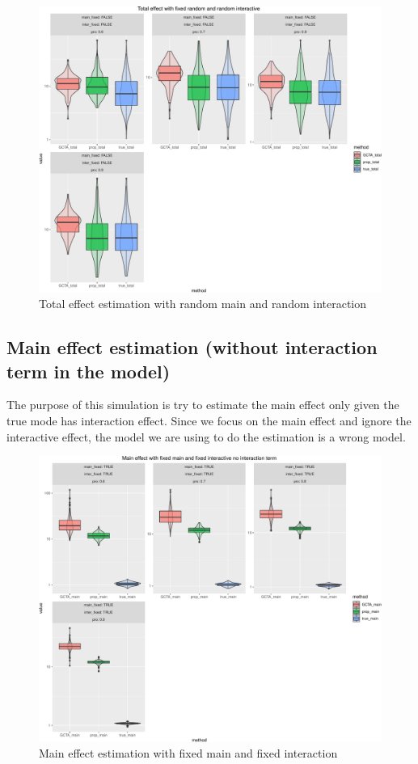 \documentclass[]{article}
\begin{document}
\begin{figure}
\centering
\includegraphics{Simulation_report_files/figure-latex/Total effect random random-1.pdf}
\caption{Total effect estimation with random main and random
interaction}
\end{figure}

\newpage 

\subsection{Main effect estimation (without interaction term in the
model)}\label{main-effect-estimation-without-interaction-term-in-the-model}

The purpose of this simulation is try to estimate the main effect only
given the true mode has interaction effect. Since we focus on the main
effect and ignore the interactive effect, the model we are using to do
the estimation is a wrong model.

\begin{figure}
\centering
\includegraphics{Simulation_report_files/figure-latex/main effect fixed fixed-1.pdf}
\caption{Main effect estimation with fixed main and fixed interaction}
\end{figure}
\end{document}
